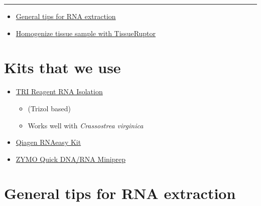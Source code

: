 \documentclass[
  letterpaper,
  DIV=11,
  numbers=noendperiod]{scrreprt}
\begin{document}
\begin{center}\rule{0.5\linewidth}{0.5pt}\end{center}

\begin{itemize}
\item
  \href{https://drk-lo.github.io/lotterhoslabprotocols/molecprot_rnaextraction/\#general-tips-for-rna-extraction}{General
  tips for RNA extraction}
\item
  \href{https://drk-lo.github.io/lotterhoslabprotocols/molecprot_rnaextraction/\#homogenize-tissue-sample-with-tissueruptor}{Homogenize
  tissue sample with TissueRuptor}
\end{itemize}

\hypertarget{kits-that-we-use}{%
\section*{\texorpdfstring{\textbf{Kits that we
use}}{Kits that we use}}\label{kits-that-we-use}}

\begin{itemize}
\item
  \href{https://drk-lo.github.io/lotterhoslabprotocols/molecprot_rnaextraction/\#protocol-for-tri-reagent-rna-isolation}{TRI
  Reagent RNA Isolation}

  \begin{itemize}
  \item
    (Trizol based)
  \item
    Works well with \emph{Crassostrea virginica}
  \end{itemize}
\item
  \href{https://drk-lo.github.io/lotterhoslabprotocols/molecprot_rnaextraction/\#protocol-with-qiagen-rnaeasy-kit}{Qiagen
  RNAeasy Kit}
\item
  \href{https://drk-lo.github.io/lotterhoslabprotocols/molecprot_rnaextraction/\#protocol-for-zymo-quick-dna-rna-miniprep-and-tissueruptor-homogenization}{ZYMO
  Quick DNA/RNA Miniprep}
\end{itemize}

\hypertarget{general-tips-for-rna-extraction}{%
\section*{\texorpdfstring{\textbf{General tips for RNA
extraction}}{General tips for RNA extraction}}\label{general-tips-for-rna-extraction}}
\end{document}
